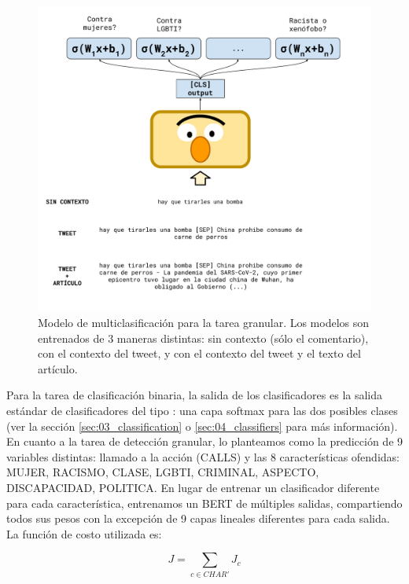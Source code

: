 \begin{figure}
    \centering
    \includegraphics[width=1.10\textwidth]{img/06/bert_contextual_classifier.pdf}
    \caption{Modelo de multiclasificación para la tarea granular. Los modelos son entrenados de 3 maneras distintas: sin contexto (sólo el comentario), con el contexto del tweet, y con el contexto del tweet y el texto del artículo.}
    \label{fig:05_multi_bert_classifier}
\end{figure}

Para la tarea de clasificación binaria, la salida de los clasificadores es la salida estándar de clasificadores del tipo \bert{}: una capa softmax para las dos posibles clases (ver la sección \ref{sec:03_classification} o \ref{sec:04_classifiers} para más información). En cuanto a la tarea de detección granular, lo planteamos como la predicción de 9 variables distintas: llamado a la acción (CALLS) y las 8 características ofendidas: MUJER, RACISMO, CLASE, LGBTI, CRIMINAL, ASPECTO, DISCAPACIDAD, POLITICA. En lugar de entrenar un clasificador diferente para cada característica, entrenamos un BERT de múltiples salidas, compartiendo todos sus pesos con la excepción de 9 capas lineales diferentes para cada salida. La función de costo utilizada es:

\begin{equation*}
    J = \sum\limits_{c \in CHAR'} J_c
\end{equation*}

